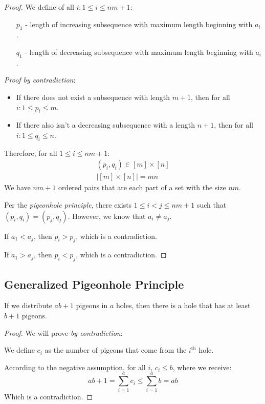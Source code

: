 \documentclass[00_complete]{subfiles}
\begin{document}
\begin{proof}
    We define of all $i: 1 \leq i \leq nm+1$:
    \begin{enumerate}
        \item[$p_1$] - length of increasing subsequence with maximum length
            beginning with $a_i$.
        \item[$q_1$] - length of decreasing subsequence with maximum length
            beginning with $a_i$.
    \end{enumerate}
    \emph{Proof by contradiction}:
    \begin{itemize} \tightlist
    \item If there does not exist a subsequence with length $m+1$, then for all $i: 1 \leq p_i \leq m$.
    \item If there also isn't a decreasing subsequence with a length $n+1$, then for
    all $i: 1 \leq q_i \leq n$.
    \end{itemize}
    Therefore, for all $1 \leq i \leq nm+1$:
    \begin{gather*}
        (p_i,q_i) \in [m] \times [n] \\
        |[m] \times [n]| = mn
    \end{gather*}
    We have $nm+1$ ordered pairs that are each part of a set with the size
    $nm$.

    Per the \emph{pigeonhole principle}, there exists $1\leq i<j \leq nm+1$
    such that $(p_i,q_i)=(p_j,q_j)$. However, we know that $a_i \neq a_j$.

    If $a_1<a_j$, then $p_i>p_j$, which is a contradiction.

    If $a_1>a_j$, then $p_i<p_j$, which is a contradiction.
\end{proof}

\subsection{Generalized Pigeonhole Principle}

If we distribute $ab+1$ pigeons in $a$ holes, then there is a hole that has at
least $b+1$ pigeons.

\begin{proof}
    We will prove \emph{by contradiction}:

    We define $c_i$ as the number of pigeons that come from the
    $i^{\mathrm{th}}$ hole.

    According to the negative assumption, for all $i$, $c_i \leq b$, where we
    receive:
    $$ab+1=\sum_{i=1}^{a}c_i\leq \sum_{i=1}^{a}b = ab$$
    Which is a contradiction.
\end{proof}
\end{document}
